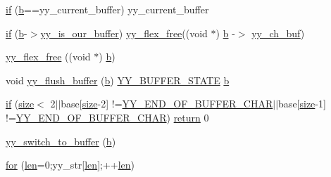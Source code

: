 \begin{DoxyCompactItemize}
\item 
\mbox{\hyperlink{expr-lex_8cpp_a9778f369b0dee28e4fc554e8fb5ca277}{if}} (\mbox{\hyperlink{expr-lex_8cpp_a91b64995742fd30063314f12340b4b5a}{b}}==yy\+\_\+current\+\_\+buffer) yy\+\_\+current\+\_\+buffer
\item 
\mbox{\hyperlink{expr-lex_8cpp_a19617a8b9d14dc2f89ec78655a642df4}{if}} (\mbox{\hyperlink{expr-lex_8cpp_a91b64995742fd30063314f12340b4b5a}{b}}-\/$>$\mbox{\hyperlink{expr-lex_8cpp_a725031cce2e48e1e5c7f713146ed73bc}{yy\+\_\+is\+\_\+our\+\_\+buffer}}) \mbox{\hyperlink{expr-lex_8cpp_a8eaf742e61b43d25af0aa73d14d6a4ae}{yy\+\_\+flex\+\_\+free}}((void $\ast$) \mbox{\hyperlink{expr-lex_8cpp_a91b64995742fd30063314f12340b4b5a}{b}} -\/$>$ \mbox{\hyperlink{expr-lex_8cpp_a49f3339224f2ff52f9191b351b184dbd}{yy\+\_\+ch\+\_\+buf}})
\item 
\mbox{\hyperlink{expr-lex_8cpp_a8eaf742e61b43d25af0aa73d14d6a4ae}{yy\+\_\+flex\+\_\+free}} ((void $\ast$) \mbox{\hyperlink{expr-lex_8cpp_a91b64995742fd30063314f12340b4b5a}{b}})
\item 
void \mbox{\hyperlink{expr-lex_8cpp_aaad521488306a55a775adfe38ce4cf49}{yy\+\_\+flush\+\_\+buffer}} (\mbox{\hyperlink{expr-lex_8cpp_a91b64995742fd30063314f12340b4b5a}{b}}) \mbox{\hyperlink{expr-lex_8cpp_a4e5bd2d129903df83f3d13effaf8f3e4}{Y\+Y\+\_\+\+B\+U\+F\+F\+E\+R\+\_\+\+S\+T\+A\+TE}} \mbox{\hyperlink{expr-lex_8cpp_a91b64995742fd30063314f12340b4b5a}{b}}
\item 
\mbox{\hyperlink{expr-lex_8cpp_ac92e5ca38477fe229935a42d4c3959db}{if}} (\mbox{\hyperlink{expr-lex_8cpp_ab7d671599a7b25ca99a487fa341bc33a}{size}}$<$ 2$\vert$$\vert$base\mbox{[}\mbox{\hyperlink{expr-lex_8cpp_ab7d671599a7b25ca99a487fa341bc33a}{size}}-\/2\mbox{]} !=\mbox{\hyperlink{expr-lex_8cpp_ab866a64da164ed2d4d444df1ef1fc9b3}{Y\+Y\+\_\+\+E\+N\+D\+\_\+\+O\+F\+\_\+\+B\+U\+F\+F\+E\+R\+\_\+\+C\+H\+AR}}$\vert$$\vert$base\mbox{[}\mbox{\hyperlink{expr-lex_8cpp_ab7d671599a7b25ca99a487fa341bc33a}{size}}-\/1\mbox{]} !=\mbox{\hyperlink{expr-lex_8cpp_ab866a64da164ed2d4d444df1ef1fc9b3}{Y\+Y\+\_\+\+E\+N\+D\+\_\+\+O\+F\+\_\+\+B\+U\+F\+F\+E\+R\+\_\+\+C\+H\+AR}}) \mbox{\hyperlink{gb_codes_c_b_8h_a9717e7bbecb906637e86cef6da3d83c2}{return}} 0
\item 
\mbox{\hyperlink{expr-lex_8cpp_a01ffaab94c1633ad975eb2e5d5ca360c}{yy\+\_\+switch\+\_\+to\+\_\+buffer}} (\mbox{\hyperlink{expr-lex_8cpp_a91b64995742fd30063314f12340b4b5a}{b}})
\item 
\mbox{\hyperlink{expr-lex_8cpp_aa656b692c972ef767f6fe691b696c978}{for}} (\mbox{\hyperlink{expr-lex_8cpp_afed088663f8704004425cdae2120b9b3}{len}}=0;yy\+\_\+str\mbox{[}\mbox{\hyperlink{expr-lex_8cpp_afed088663f8704004425cdae2120b9b3}{len}}\mbox{]};++\mbox{\hyperlink{expr-lex_8cpp_afed088663f8704004425cdae2120b9b3}{len}})

\end{DoxyCompactItemize}
